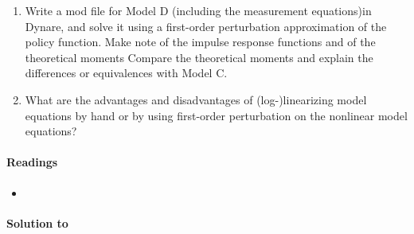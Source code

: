 \begin{enumerate}
\item Write a mod file for Model D (including the measurement equations)in Dynare,
  and solve it using a first-order perturbation approximation of the policy function.
Make note of the impulse response functions and of the theoretical moments
Compare the theoretical moments and explain the differences or equivalences with Model C.
  
\item What are the advantages and disadvantages of (log-)linearizing model equations by hand
  or by using first-order perturbation on the nonlinear model equations?
  
\end{enumerate}

\paragraph{Readings}
\begin{itemize}
	\item \textcite{An.Schorfheide_2007_BayesianAnalysisDSGE}
\end{itemize}

\begin{solution}\textbf{Solution to }
\ifDisplaySolutions

\fi
\newpage
\end{solution}